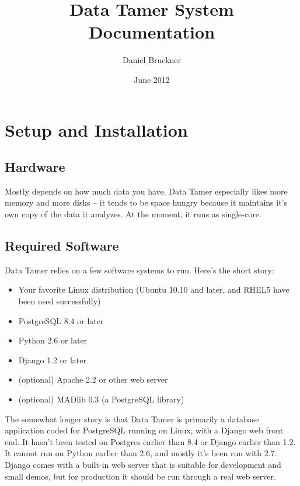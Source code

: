 \author{Daniel Bruckner}
\title{Data Tamer System Documentation}
\date{June 2012}

\usepackage{hyperref}

\usepackage[parfill]{parskip}



\maketitle
\tableofcontents

\raggedright

\section{Setup and Installation}

\subsection{Hardware}

Mostly depends on how much data you have.  Data Tamer especially likes more memory and more disks -- it tends to be space hungry because it maintains it's own copy of the data it analyzes.  At the moment, it runs as single-core.


\subsection{Required Software}

Data Tamer relies on a few software systems to run.  Here's the short story:

\begin{itemize}
\item Your favorite Linux distribution (Ubuntu 10.10 and later, and RHEL5 have been used successfully)
\item PostgreSQL 8.4 or later
\item Python 2.6 or later
\item Django 1.2 or later
\item (optional) Apache 2.2 or other web server
\item (optional) MADlib 0.3 (a PostgreSQL library)
\end{itemize}

The somewhat longer story is that Data Tamer is primarily a database application coded for PostgreSQL running on Linux, with a Django web front end.  It hasn't been tested on Postgres earlier than 8.4 or Django earlier than 1.2.  It cannot run on Python earlier than 2.6, and mostly it's been run with 2.7.  Django comes with a built-in web server that is suitable for development and small demos, but for production it should be run through a real web server.

